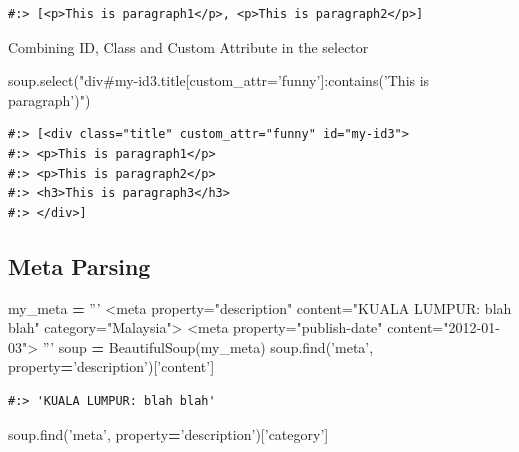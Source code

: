 \documentclass[
]{book}
\newenvironment{Shaded}{\begin{snugshade}}{\end{snugshade}}
\newcommand{\BuiltInTok}[1]{#1}
\newcommand{\NormalTok}[1]{#1}
\newcommand{\OperatorTok}[1]{\textcolor[rgb]{0.43,0.43,0.43}{\textbf{#1}}}
\newcommand{\StringTok}[1]{\textcolor[rgb]{0.5,0.5,0.5}{#1}}
\begin{document}
\begin{verbatim}
#:> [<p>This is paragraph1</p>, <p>This is paragraph2</p>]
\end{verbatim}

Combining ID, Class and Custom Attribute in the selector

\begin{Shaded}
\begin{Highlighting}[]
\NormalTok{soup.select(}\StringTok{"div#my-id3.title[custom_attr='funny']:contains('This is paragraph')"}\NormalTok{)}
\end{Highlighting}
\end{Shaded}

\begin{verbatim}
#:> [<div class="title" custom_attr="funny" id="my-id3">
#:> <p>This is paragraph1</p>
#:> <p>This is paragraph2</p>
#:> <h3>This is paragraph3</h3>
#:> </div>]
\end{verbatim}

\hypertarget{meta-parsing}{%
\subsection{Meta Parsing}\label{meta-parsing}}

\begin{Shaded}
\begin{Highlighting}[]
\NormalTok{my_meta }\OperatorTok{=} \StringTok{'''}
\StringTok{<meta property="description"   content="KUALA LUMPUR: blah blah"   category="Malaysia">}
\StringTok{<meta property="publish-date"  content="2012-01-03">}
\StringTok{'''}
\NormalTok{soup }\OperatorTok{=}\NormalTok{ BeautifulSoup(my_meta)}
\NormalTok{soup.find(}\StringTok{'meta'}\NormalTok{, }\BuiltInTok{property}\OperatorTok{=}\StringTok{'description'}\NormalTok{)[}\StringTok{'content'}\NormalTok{]}
\end{Highlighting}
\end{Shaded}

\begin{verbatim}
#:> 'KUALA LUMPUR: blah blah'
\end{verbatim}

\begin{Shaded}
\begin{Highlighting}[]
\NormalTok{soup.find(}\StringTok{'meta'}\NormalTok{, }\BuiltInTok{property}\OperatorTok{=}\StringTok{'description'}\NormalTok{)[}\StringTok{'category'}\NormalTok{]}
\end{Highlighting}
\end{Shaded}
\end{document}
